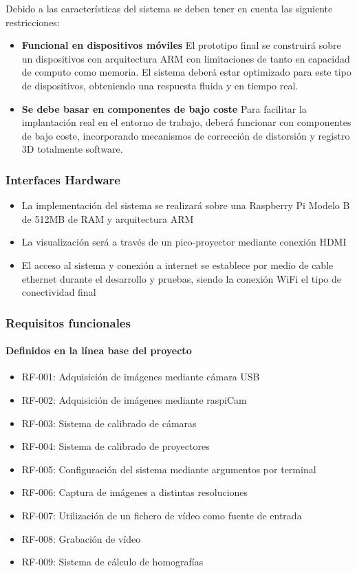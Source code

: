 Debido a las características del sistema se deben tener en cuenta las siguiente restricciones:
\begin{itemize}
\item\textbf{Funcional en dispositivos móviles} El prototipo final se construirá sobre un dispositivos con arquitectura ARM con limitaciones de tanto en capacidad de computo como memoria. El sistema deberá estar optimizado para este tipo de dispositivos, obteniendo una respuesta fluida y en tiempo real.   
  
\item\textbf{Se debe basar en componentes de bajo coste} Para facilitar la implantación real en el entorno de trabajo, deberá funcionar con componentes de bajo coste, incorporando mecanismos de corrección de distorsión y registro 3D totalmente software.
\end{itemize}

\subsubsection{Interfaces Hardware}
\begin{itemize}
\item La implementación del sistema se realizará sobre una Raspberry Pi Modelo B de 512MB de RAM y arquitectura ARM 
\item La visualización será a través de un pico-proyector mediante conexión HDMI
\item El acceso al sistema y conexión a internet se establece por medio de cable ethernet durante el desarrollo y pruebas, siendo la conexión WiFi el tipo de conectividad final
\end{itemize}

\subsubsection{Requisitos funcionales}
\paragraph{Definidos en la línea base del proyecto}
\begin{itemize}
\item RF-001: Adquisición de imágenes mediante cámara USB
\item RF-002: Adquisición de imágenes mediante raspiCam
\item RF-003: Sistema de calibrado de cámaras
\item RF-004: Sistema de calibrado de proyectores
\item RF-005: Configuración del sistema mediante argumentos por terminal
\item RF-006: Captura de imágenes a distintas resoluciones
\item RF-007: Utilización de un fichero de vídeo como fuente de entrada
\item RF-008: Grabación de vídeo
\item RF-009: Sistema de cálculo de homografías
\end{itemize}

